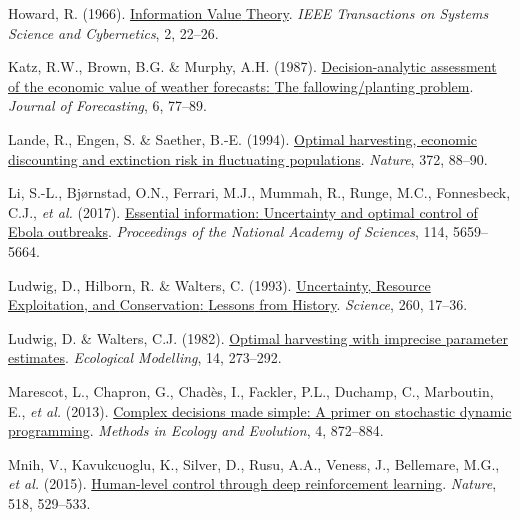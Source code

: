 \documentclass[3p]{elsarticle} %
\newlength{\cslhangindent}
\newenvironment{CSLReferences}[2] %
 {%
  \setlength{\parindent}{0pt}
  \ifodd #1 \everypar{\setlength{\hangindent}{\cslhangindent}}\ignorespaces\fi
  \ifnum #2 > 0
  \setlength{\parskip}{#2\baselineskip}
  \fi
 }%
 {}
\begin{document}
\begin{CSLReferences}{1}{0}
\leavevmode{}%
Howard, R. (1966).
\href{https://doi.org/10.1109/TSSC.1966.300074}{Information {Value}
{Theory}}. \emph{IEEE Transactions on Systems Science and Cybernetics},
2, 22--26.

\leavevmode{}%
Katz, R.W., Brown, B.G. \& Murphy, A.H. (1987).
\href{https://doi.org/10.1002/for.3980060202}{Decision-analytic
assessment of the economic value of weather forecasts: {The}
fallowing/planting problem}. \emph{Journal of Forecasting}, 6, 77--89.

\leavevmode{}%
Lande, R., Engen, S. \& Saether, B.-E. (1994).
\href{https://doi.org/10.1038/372088a0}{Optimal harvesting, economic
discounting and extinction risk in fluctuating populations}.
\emph{Nature}, 372, 88--90.

\leavevmode{}%
Li, S.-L., Bjørnstad, O.N., Ferrari, M.J., Mummah, R., Runge, M.C.,
Fonnesbeck, C.J., \emph{et al.} (2017).
\href{https://doi.org/10.1073/pnas.1617482114}{Essential information:
{Uncertainty} and optimal control of {Ebola} outbreaks}.
\emph{Proceedings of the National Academy of Sciences}, 114, 5659--5664.

\leavevmode{}%
Ludwig, D., Hilborn, R. \& Walters, C. (1993).
\href{https://doi.org/10.1126/science.260.5104.17}{Uncertainty,
{Resource} {Exploitation}, and {Conservation}: {Lessons} from
{History}}. \emph{Science}, 260, 17--36.

\leavevmode{}%
Ludwig, D. \& Walters, C.J. (1982).
\href{https://doi.org/10.1016/0304-3800(82)90023-0}{Optimal harvesting
with imprecise parameter estimates}. \emph{Ecological Modelling}, 14,
273--292.

\leavevmode{}%
Marescot, L., Chapron, G., Chadès, I., Fackler, P.L., Duchamp, C.,
Marboutin, E., \emph{et al.} (2013).
\href{https://doi.org/10.1111/2041-210X.12082}{Complex decisions made
simple: A primer on stochastic dynamic programming}. \emph{Methods in
Ecology and Evolution}, 4, 872--884.

\leavevmode{}%
Mnih, V., Kavukcuoglu, K., Silver, D., Rusu, A.A., Veness, J.,
Bellemare, M.G., \emph{et al.} (2015).
\href{https://doi.org/10.1038/nature14236}{Human-level control through
deep reinforcement learning}. \emph{Nature}, 518, 529--533.


\end{CSLReferences}
\end{document}
